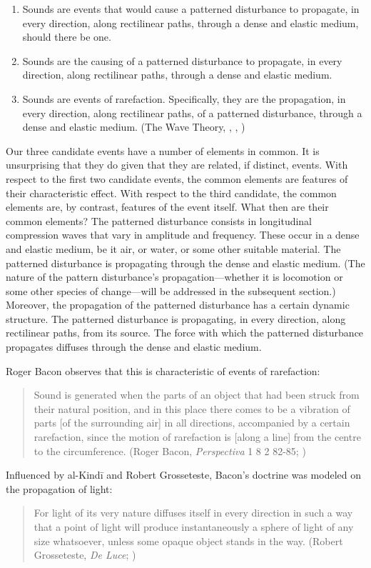 \documentclass[12pt]{article}
\begin{document}
\begin{enumerate}[(1)]
	\item Sounds are events that would cause a patterned disturbance to propagate, in every direction, along rectilinear paths, through a dense and elastic medium, should there be one. \citep{Casati:1994aa}
	\item Sounds are the causing of a patterned disturbance to propagate, in every direction, along rectilinear paths, through a dense and elastic medium. \citep{OCallaghan:2007xy}
	\item Sounds are events of rarefaction. Specifically, they are the propagation, in every direction, along rectilinear paths, of a patterned disturbance, through a dense and elastic medium. (The Wave Theory, \citealt{OShaughnessy:2009aa}, \citealt{Sorensen:2009aa}, \citealt[chapters 3–4]{Kalderon:2018oe})
\end{enumerate}
Our three candidate events have a number of elements in common. It is unsurprising that they do given that they are related, if distinct, events. With respect to the first two candidate events, the common elements are features of their characteristic effect. With respect to the third candidate, the common elements are, by contrast, features of the event itself. What then are their common elements? The patterned disturbance consists in longitudinal compression waves that vary in amplitude and frequency. These occur in a dense and elastic medium, be it air, or water, or some other suitable material. The patterned disturbance is propagating through the dense and elastic medium. (The nature of the pattern disturbance's propagation---whether it is locomotion or some other species of change---will be addressed in the subsequent section.) Moreover, the propagation of the patterned disturbance has a certain dynamic structure. The patterned disturbance is propagating, in every direction, along rectilinear paths, from its source. The force with which the patterned disturbance propagates diffuses through the dense and elastic medium. 

Roger Bacon observes that this is characteristic of events of rarefaction:
\begin{quote}
	Sound is generated when the parts of an object that had been struck from their natural position, and in this place there comes to be a vibration of parts [of the surrounding air] in all directions, accompanied by a certain rarefaction, since the motion of rarefaction is [along a line] from the centre to the circumference. (Roger Bacon, \emph{Perspectiva} 1 8 2 82-85; \citealt{Lindberg:1996bk})
\end{quote}
Influenced by al-Kindī and Robert Grosseteste, Bacon’s doctrine was modeled on the propagation of light:
\begin{quote}
	For light of its very nature diffuses itself in every direction in such a way that a point of light will produce instantaneously a sphere of light of any size whatsoever, unless some opaque object stands in the way. (Robert Grosseteste, \emph{De Luce}; \citealt[10]{Riedl:1942it})
\end{quote}
\end{document}
